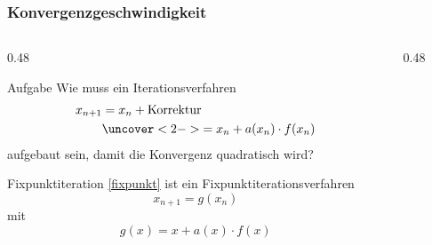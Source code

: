 %
%
%
\begin{frame}
\frametitle{Konvergenzgeschwindigkeit}
\vspace{-15pt}
\begin{columns}[t]
\begin{column}{0.48\hsize}
\begin{block}{Aufgabe}
Wie muss ein Iterationsverfahren
\begin{align}
x_{n+1}
&=x_n + \text{Korrektur}
\notag
\\
&\uncover<2->{=
x_n + a(x_n) \cdot f(x_n)}
\label{fixpunkt}
\end{align}
aufgebaut sein, damit die Konvergenz quadratisch wird?
\end{block}
\begin{block}{Fixpunktiteration}
\eqref{fixpunkt} ist ein Fixpunktiterationsverfahren 
\[
x_{n+1}=g(x_n)
\]
\vspace{-5pt}
mit
\vspace{-5pt}
\[
g(x) = x + a(x)\cdot f(x)
\]
\end{block}
\end{column}
\begin{column}{0.48\hsize}
\end{column}
\end{columns}
\end{frame}
